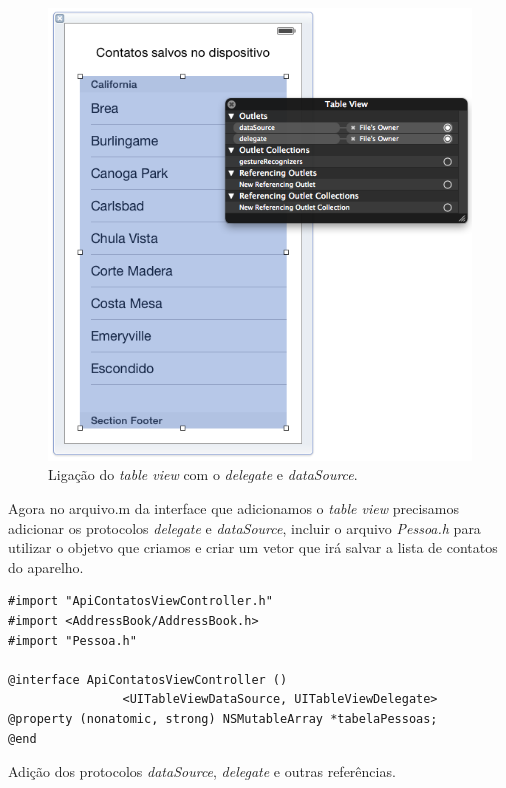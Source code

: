 \documentclass[a4paper,12pt,brazil,doubleside]{book}
\begin{document}
\begin{singlespace}
\begin{figure}[H]
  \centering
  \includegraphics[totalheight=0.55\textheight]{figuras/4/api_contatos1.png}
  \caption{Ligação do \emph{table view} com o \emph{delegate} e \emph{dataSource}.}
  \label{fig:a}
\end{figure}

Agora no arquivo.m da interface que adicionamos o \emph{table view} precisamos adicionar os protocolos \emph{delegate} e \emph{dataSource}, incluir o arquivo \emph{Pessoa.h} para utilizar o objetvo que criamos e criar um vetor que irá salvar a lista de contatos do aparelho.

\begin{listing}[H]
\begin{verbatim}
#import "ApiContatosViewController.h"
#import <AddressBook/AddressBook.h>
#import "Pessoa.h"

@interface ApiContatosViewController () 
				<UITableViewDataSource, UITableViewDelegate>
@property (nonatomic, strong) NSMutableArray *tabelaPessoas;
@end
\end{verbatim}
\caption{Adição dos protocolos \emph{dataSource}, \emph{delegate} e outras referências.}
\end{listing}


\end{singlespace}
\end{document}
